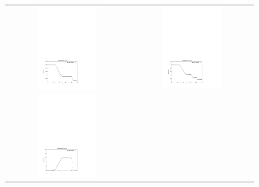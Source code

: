 \begin{figure}[htbp]
\begin{tabular}{cc}
\includegraphics[width=0.5\textwidth,viewport=51 58 400 298,clip=true]{../3D/sod/sod_p.pdf} &
\includegraphics[width=0.5\textwidth,viewport=51 58 400 298,clip=true]{../3D/sod/sod_rho.pdf}\\
\includegraphics[width=0.5\textwidth,viewport=51 58 400 298,clip=true]{../3D/sod/sod_u.pdf} &

\end{tabular}
\end{figure}
